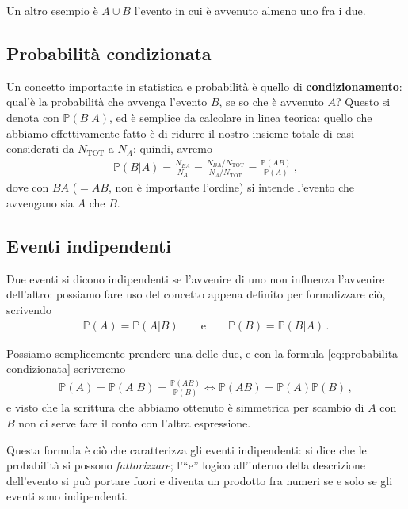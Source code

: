 \documentclass{article}
\begin{document}
Un altro esempio è \(A \cup B\) l'evento in cui è avvenuto almeno uno fra i due.

\subsection{Probabilità condizionata}

Un concetto importante in statistica e probabilità è quello di \textbf{condizionamento}: qual'è la probabilità che avvenga l'evento \(B\), se so che è avvenuto \(A\)? 
Questo si denota con \(\mathbb{P} (B | A)\), ed è semplice da calcolare in linea teorica: quello che abbiamo effettivamente fatto è di ridurre il nostro insieme totale di casi considerati da \(N _{\text{TOT}}\) a \(N_A\): quindi, avremo 
%
\begin{align} \label{eq:probabilita-condizionata}
\mathbb{P}(B | A) = \frac{N_{BA}}{N_A} = \frac{ N_{BA} / N _{\text{TOT}}}{N_A / N _{\text{TOT}}} = \frac{\mathbb{P}(AB)}{\mathbb{P}(A)}
\,,
\end{align}
%
dove con \(BA\) (\(= AB\), non è importante l'ordine) si intende l'evento che avvengano sia \(A\) che \(B\). 

\subsection{Eventi indipendenti}

Due eventi si dicono indipendenti se l'avvenire di uno non influenza l'avvenire dell'altro: possiamo fare uso del concetto appena definito per formalizzare ciò, scrivendo 
%
\begin{align}
\mathbb{P}(A) = \mathbb{P}(A | B) 
\qquad \text{e} \qquad
\mathbb{P}(B) = \mathbb{P}(B | A) 
\,.
\end{align}

Possiamo semplicemente prendere una delle due, e con la formula \eqref{eq:probabilita-condizionata} scriveremo 
%
\begin{align} \label{eq:probabilita-indipenenti}
\mathbb{P}(A) = \mathbb{P}(A | B) = \frac{\mathbb{P}(AB)}{\mathbb{P}(B)}
\iff
\mathbb{P}(AB) = \mathbb{P}(A) \mathbb{P}(B)
\,,
\end{align}
%
e visto che la scrittura che abbiamo ottenuto è simmetrica per scambio di \(A\) con \(B\) non ci serve fare il conto con l'altra espressione.

Questa formula è ciò che caratterizza gli eventi indipendenti: si dice che le probabilità si possono \emph{fattorizzare}; l'``e'' logico all'interno della descrizione dell'evento si può portare fuori e diventa un prodotto fra numeri se e solo se gli eventi sono indipendenti.
\end{document}
